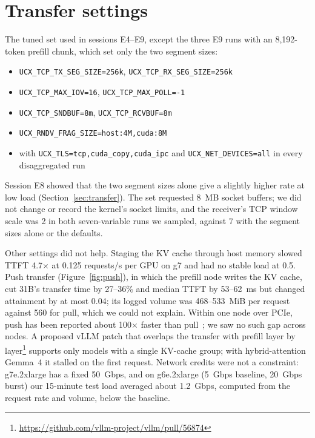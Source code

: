 \documentclass[11pt]{article}
\begin{document}
\section{Transfer settings}\label{app:ucx}
The tuned set used in sessions E4--E9, except the three E9 runs with an 8,192-token prefill chunk, which set only the two segment sizes:
{\small
\begin{itemize}
  \item \texttt{UCX\_TCP\_TX\_SEG\_SIZE=256k}, \texttt{UCX\_TCP\_RX\_SEG\_SIZE=256k}
  \item \texttt{UCX\_TCP\_MAX\_IOV=16}, \texttt{UCX\_TCP\_MAX\_POLL=-1}
  \item \texttt{UCX\_TCP\_SNDBUF=8m}, \texttt{UCX\_TCP\_RCVBUF=8m}
  \item \texttt{UCX\_RNDV\_FRAG\_SIZE=host:4M,cuda:8M}
  \item with \texttt{UCX\_TLS=tcp,cuda\_copy,cuda\_ipc} and \texttt{UCX\_NET\_DEVICES=all} in every disaggregated run
\end{itemize}}
Session E8 showed that the two segment sizes alone give a slightly higher rate at low load (Section~\ref{sec:transfer}). The set requested 8~MB socket buffers; we did not change or record the kernel's socket limits, and the receiver's TCP window scale was 2 in both seven-variable runs we sampled, against 7 with the segment sizes alone or the defaults.

Other settings did not help. Staging the KV cache through host memory slowed TTFT 4.7$\times$ at 0.125 requests/s per GPU on g7 and had no stable load at 0.5. Push transfer (Figure~\ref{fig:push}), in which the prefill node writes the KV cache, cut 31B's transfer time by 27--36\% and median TTFT by 53--62~ms but changed attainment by at most 0.04; its logged volume was 468--533~MiB per request against 560 for pull, which we could not explain. Within one node over PCIe, push has been reported about 100$\times$ faster than pull~\cite{vllm52607}; we saw no such gap across nodes. A proposed vLLM patch that overlaps the transfer with prefill layer by layer\footnote{\url{https://github.com/vllm-project/vllm/pull/56874}} supports only models with a single KV-cache group; with hybrid-attention Gemma~4 it stalled on the first request. Network credits were not a constraint: g7e.2xlarge has a fixed 50~Gbps, and on g6e.2xlarge (5~Gbps baseline, 20~Gbps burst) our 15-minute test load averaged about 1.2~Gbps, computed from the request rate and volume, below the baseline.
\end{document}
